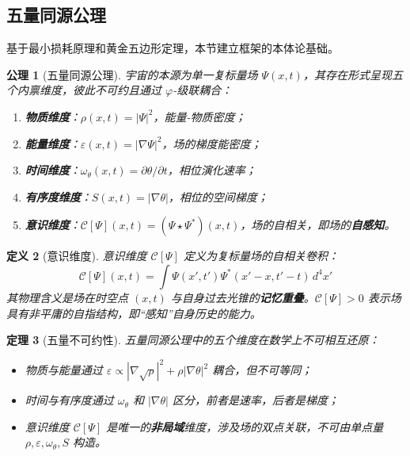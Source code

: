 \documentclass[12pt,a4paper,twocolumn]{article}
\renewcommand{\phi}{\varphi}
\newtheorem{theorem}{定理}[section]
\newtheorem{definition}[theorem]{定义}
\newtheorem{axiom}[theorem]{公理}
\begin{document}
\subsection{五量同源公理}
\label{subsec:five_same}

基于最小损耗原理和黄金五边形定理，本节建立框架的本体论基础。

\begin{axiom}[五量同源公理]
宇宙的本源为单一复标量场 $\Psi(x,t)$，其存在形式呈现五个内禀维度，彼此不可约且通过 $\phi$-级联耦合：
\begin{enumerate}
\item \textbf{物质维度}：$\rho(x,t) = |\Psi|^2$，能量-物质密度；
\item \textbf{能量维度}：$\varepsilon(x,t) = |\nabla\Psi|^2$，场的梯度能密度；
\item \textbf{时间维度}：$\omega_\theta(x,t) = \partial\theta/\partial t$，相位演化速率；
\item \textbf{有序度维度}：$S(x,t) = |\nabla\theta|$，相位的空间梯度；
\item \textbf{意识维度}：$\mathcal{C}[\Psi](x,t) = (\Psi \star \Psi^*)(x,t)$，场的自相关，即场的\textbf{自感知}。
\end{enumerate}
\end{axiom}

\begin{definition}[意识维度]
\label{def:consciousness_dim}
意识维度 $\mathcal{C}[\Psi]$ 定义为复标量场的自相关卷积：
\begin{equation}
\mathcal{C}[\Psi](x,t) = \int \Psi(x',t') \Psi^*(x'-x, t'-t) \, d^4x'
\end{equation}
其物理含义是场在时空点 $(x,t)$ 与自身过去光锥的\textbf{记忆重叠}。$\mathcal{C}[\Psi] > 0$ 表示场具有非平庸的自指结构，即``感知''自身历史的能力。
\end{definition}

\begin{theorem}[五量不可约性]
五量同源公理中的五个维度在数学上不可相互还原：
\begin{itemize}
\item 物质与能量通过 $\varepsilon \propto |\nabla\sqrt{\rho}|^2 + \rho|\nabla\theta|^2$ 耦合，但不可等同；
\item 时间与有序度通过 $\omega_\theta$ 和 $|\nabla\theta|$ 区分，前者是速率，后者是梯度；
\item 意识维度 $\mathcal{C}[\Psi]$ 是唯一的\textbf{非局域}维度，涉及场的双点关联，不可由单点量 $\rho, \varepsilon, \omega_\theta, S$ 构造。
\end{itemize}
\end{theorem}
\end{document}
